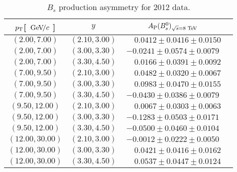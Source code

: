 \begin{table}[h]
\caption{$B_s$ production asymmetry for 2012 data.}
\centering
\begin{tabular}{c|c|c|c}
\mbox{$p_{\rm T}$}\xspace [ $ {\mathrm{\,Ge\kern -0.1em V\!/}c}$ \xspace] & $y$ & $A_{\rm P}( B\xspace\xspace^0_ s\xspace\xspace\xspace)_{\sqrt{s}\xspace = 8\, \mathrm{\,Te\kern -0.1em V}\xspace}$  \\
\hline
$(2.00,   7.00)$   &  $(2.10,  3.00)$  &  $  \phantom{-}0.0412  \pm  0.0416  \pm  0.0150  $    \\
$(2.00,   7.00)$   &  $(3.00,  3.30)$  &  $  -0.0241            \pm  0.0574  \pm  0.0079  $           \\
$(2.00,   7.00)$   &  $(3.30,  4.50)$  &  $  \phantom{-}0.0166  \pm  0.0391  \pm  0.0092  $    \\
$(7.00,   9.50)$   &  $(2.10,  3.00)$  &  $  \phantom{-}0.0482  \pm  0.0320  \pm  0.0067  $    \\
$(7.00,   9.50)$   &  $(3.00,  3.30)$  &  $  \phantom{-}0.0983  \pm  0.0470  \pm  0.0155  $    \\
$(7.00,   9.50)$   &  $(3.30,  4.50)$  &  $  -0.0430            \pm  0.0386  \pm  0.0079  $          \\
$(9.50,   12.00)$  &  $(2.10,  3.00)$  &  $  \phantom{-}0.0067  \pm  0.0303  \pm  0.0063  $  \\
$(9.50,   12.00)$  &  $(3.00,  3.30)$  &  $  -0.1283            \pm  0.0503  \pm  0.0171  $          \\
$(9.50,   12.00)$  &  $(3.30,  4.50)$  &  $  -0.0500            \pm  0.0460  \pm  0.0104  $         \\
$(12.00,  30.00)$  &  $(2.10,  3.00)$  &  $  -0.0012            \pm  0.0222  \pm  0.0050  $         \\
$(12.00,  30.00)$  &  $(3.00,  3.30)$  &  $  \phantom{-}0.0421  \pm  0.0416  \pm  0.0162  $   \\
$(12.00,  30.00)$  &  $(3.30,  4.50)$  &  $  \phantom{-}0.0537  \pm  0.0447  \pm  0.0124  $   \\
\end{tabular}
\end{table}